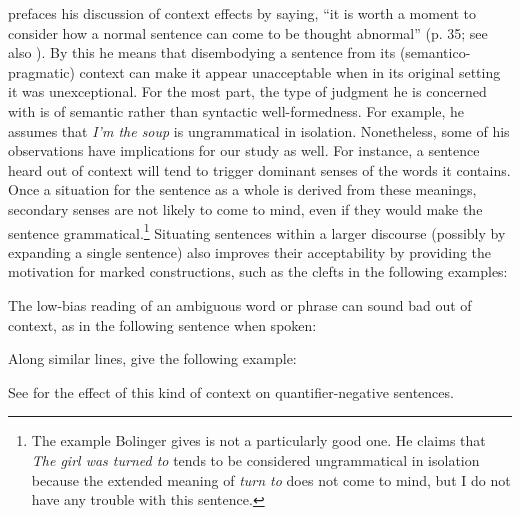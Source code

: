 \citet{Bolinger1968} prefaces his discussion of context effects by saying, ``it is worth a moment to consider how a normal sentence can come to be thought abnormal'' (p. 35; see also \citet{Bolinger1971}). By this he means that disembodying a sentence from its (semantico-pragmatic) context can make it appear unacceptable when in its original setting it was unexceptional. For the most part, the type of judgment he is concerned with is of semantic rather than syntactic well-formedness. For example, he assumes that \textit{I'm the soup} is ungrammatical in isolation. Nonetheless, some of his observations have implications for our study as well. For instance, a sentence heard out of context will tend to trigger dominant senses of the words it contains. Once a situation for the sentence as a whole is derived from these meanings, secondary senses are not likely to come to mind, even if they would make the sentence grammatical.\footnote{The example Bolinger gives is not a particularly good one. He claims that \textit{The girl was turned to} tends to be considered ungrammatical in isolation because the extended meaning of \textit{turn to} does not come to mind, but I do not have any trouble with this sentence.
}
 Situating sentences within a larger discourse (possibly by expanding a single sentence) also improves their acceptability by providing the motivation for marked constructions, such as the clefts in the following examples:

\z

\z


\noindent
The low-bias reading of an ambiguous word or phrase can sound bad out of context, as in the following sentence when spoken:

\z

\noindent
Along similar lines, \citet{BeverEtAl1976a} give the following example:
\ea
{}
\z
\z

\noindent
See  for the effect of this kind of context on quantifier-negative sentences.

